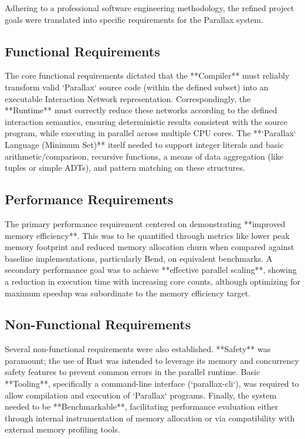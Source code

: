 Adhering to a professional software engineering methodology, the refined project goals were translated into specific requirements for the Parallax system.

\subsection{Functional Requirements} %
The core functional requirements dictated that the **Compiler** must reliably transform valid `Parallax` source code (within the defined subset) into an executable Interaction Network representation. Correspondingly, the **Runtime** must correctly reduce these networks according to the defined interaction semantics, ensuring deterministic results consistent with the source program, while executing in parallel across multiple CPU cores. The **`Parallax` Language (Minimum Set)** itself needed to support integer literals and basic arithmetic/comparison, recursive functions, a means of data aggregation (like tuples or simple ADTs), and pattern matching on these structures.

\subsection{Performance Requirements} %
The primary performance requirement centered on demonstrating **improved memory efficiency**. This was to be quantified through metrics like lower peak memory footprint and reduced memory allocation churn when compared against baseline implementations, particularly Bend, on equivalent benchmarks. A secondary performance goal was to achieve **effective parallel scaling**, showing a reduction in execution time with increasing core counts, although optimizing for maximum speedup was subordinate to the memory efficiency target.

\subsection{Non-Functional Requirements} %
Several non-functional requirements were also established. **Safety** was paramount; the use of Rust was intended to leverage its memory and concurrency safety features to prevent common errors in the parallel runtime. Basic **Tooling**, specifically a command-line interface (`parallax-cli`), was required to allow compilation and execution of `Parallax` programs. Finally, the system needed to be **Benchmarkable**, facilitating performance evaluation either through internal instrumentation of memory allocation or via compatibility with external memory profiling tools.

